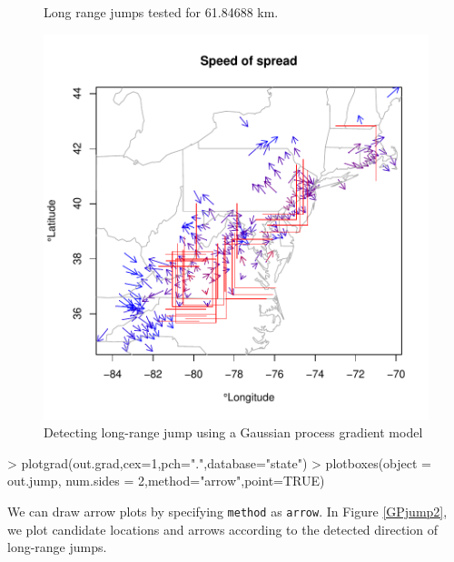 \documentclass{article}
\newcommand{\code}[1]{{\tt #1}}
\begin{document}
\begin{figure}
\begin{center}
\begin{Schunk}
\begin{Soutput}
Long range jumps tested for  61.84688 km.
\end{Soutput}
\end{Schunk}
\includegraphics{invasionSpeed_doc-014}
\end{center}
\caption{Detecting long-range jump using a Gaussian process gradient model}
\label{GPjump1}
\end{figure}

\begin{Schunk}
\begin{Sinput}
> plotgrad(out.grad,cex=1,pch=".",database="state")
> plotboxes(object = out.jump, num.sides = 2,method="arrow",point=TRUE)
\end{Sinput}
\end{Schunk}
We can draw arrow plots by specifying \code{method} as \code{arrow}. In Figure \ref{GPjump2}, we plot candidate locations and arrows according to the detected direction of long-range jumps.
\end{document}
